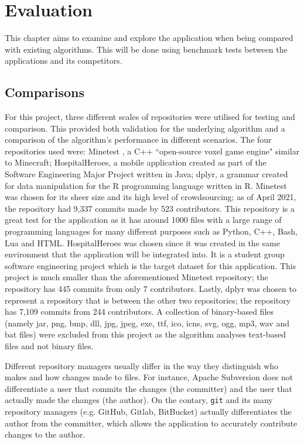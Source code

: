\chapter{Evaluation}
This chapter aims to examine and explore the application when being compared with existing algorithms. This will be done using benchmark tests between the applications and its competitors. 

\section{Comparisons}

For this project, three different scales of repositories were utilised for testing and comparison. This provided both validation for the underlying algorithm and a comparison of the algorithm's performance in different scenarios. The four repositories used were: Minetest \citep{ahola_2021}, a C++ ``open-source voxel game engine" similar to Minecraft; HospitalHeroes, a mobile application created as part of the Software Engineering Major Project written in Java; dplyr, a grammar created for data manipulation for the R programming language written in R. Minetest was chosen for its sheer size and its high level of crowdsourcing; as of April 2021, the repository had 9,337 commits made by 523 contributors. This repository is a great test for the application as it has around 1000 files with a large range of programming languages for many different purposes such as Python, C++, Bash, Lua and HTML. HospitalHeroes was chosen since it was created in the same environment that the application will be integrated into. It is a student group software engineering project which is the target dataset for this application. This project is much smaller than the aforementioned Minetest repository; the repository has 445 commits from only 7 contributors. Lastly, dplyr was chosen to represent a repository that is between the other two repositories; the repository has 7,109 commits from 244 contributors. A collection of binary-based files (namely jar, png, bmp, dll, jpg, jpeg, exe, ttf, ico, icns, svg, ogg, mp3, wav and bat files) were excluded from this project as the algorithm analyses text-based files and not binary files. 

Different repository managers usually differ in the way they distinguish who makes and how changes made to files. For instance, Apache Subversion does not differentiate a user that commits the changes (the committer) and the user that actually made the changes (the author). On the contary, \texttt{git} and its many repository managers (e.g. GitHub, Gitlab, BitBucket) actually differentiates the author from the committer, which allows the application to accurately contribute changes to the author. 

